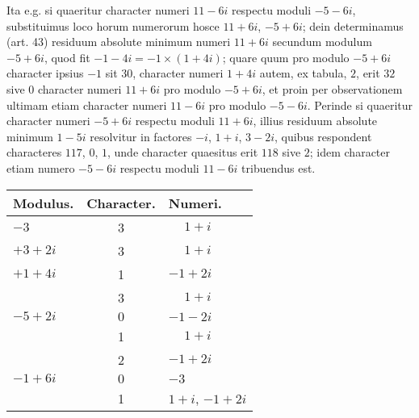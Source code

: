 \documentclass[twoside,12pt, showframe]{memoir}
\begin{document}
Ita e.g. si quaeritur character numeri \(11-6 i\) respectu moduli \(-5-6 i\), substituimus loco horum numerorum hosce \(11+6 i\), \(-5+6 i\); dein determinamus (art. 43) residuum absolute minimum numeri \(11+6 i\) secundum modulum \(-5+6 i\), quod fit \(-1-4 i=-1 \times(1+4 i)\); quare quum pro modulo \(-5+6 i\) character ipsius \(-1\) sit \(30\), character numeri \(1+4 i\) autem, ex tabula, \(2\), erit \(32\) sive \(0\) character numeri \(11+6 i\) pro modulo \(-5+6 i\), et proin per observationem ultimam etiam character numeri \(11-6 i\) pro modulo \(-5-6 i\). Perinde si quaeritur character numeri \(-5+6 i\) respectu moduli \(11+6 i\), illius residuum absolute minimum \(1-5 i\) resolvitur in factores \(-i\), \( 1+i\), \( 3-2 i\), quibus respondent characteres \(117\), \(0\), \(1\), unde character quaesitus erit \(118\) sive \(2\); idem character etiam numero \(-5-6 i\) respectu moduli \(11-6 i\) tribuendus est.
\begin{center}
\begin{tabular}{l|c|l}
Modulus. & Character. & Numeri. \\
\hline
\(-3\) & 3 & \(\phantom{+}1+i\) \\
\(+3+2 i\) & 3 & \(\phantom{+}1+i\) \\
\(+1+4 i\) & 1 & \(-1+2 i\) \\
 & 3 & \(\phantom{+}1+i\) \\
 \(-5+2 i\)& \(0\) & \(-1-2 i\) \\
 & 1 & \(\phantom{+}1+i\) \\
& 2 & \(-1+2 i\) \\
 \(-1+6 i\) & \(0\) & \(-3\) \\
 &1&\(1+i\), \(-1+2i\)
\end{tabular}
\end{center}\clearpage\noindent%
\end{document}
